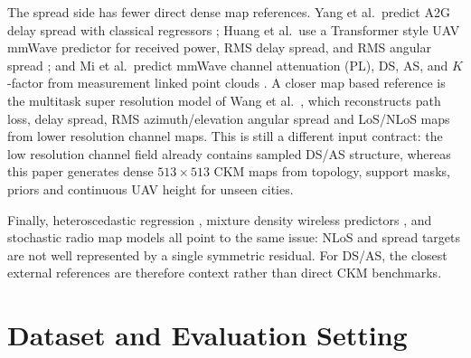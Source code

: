 \documentclass[journal]{IEEEtran}
\begin{document}
The spread side has fewer direct dense map references. Yang et al.\ predict
A2G delay spread with classical regressors \cite{yang2019a2gml}; Huang et al.\
use a Transformer style UAV mmWave predictor for received power, RMS delay
spread, and RMS angular spread \cite{huang2025a2gtransformer}; and Mi et al.\
predict mmWave channel attenuation (PL), DS, AS, and \(K\)-factor from measurement linked point
clouds \cite{mi2024pointcloud}. A closer map based reference is the multitask
super resolution model of Wang et al.\ \cite{wang2023multitasksr}, which
reconstructs path loss, delay spread, RMS azimuth/elevation angular spread and
LoS/NLoS maps from lower resolution channel maps. This is still a different
input contract: the low resolution channel field already contains sampled DS/AS
structure, whereas this paper generates dense \(513\times513\) CKM maps from
topology, support masks, priors and continuous UAV height for unseen cities.

Finally, heteroscedastic regression \cite{kendall2017uncertainties}, mixture
density wireless predictors \cite{saleh2021probabilistic,garciamarti2020mixture,
lee2024timevarying}, and stochastic radio map models \cite{radiodiff2025}
all point to the same issue: NLoS and spread targets are not well represented
by a single symmetric residual. For DS/AS, the closest external references are
therefore context rather than direct CKM benchmarks.

\section{Dataset and Evaluation Setting}
\end{document}
